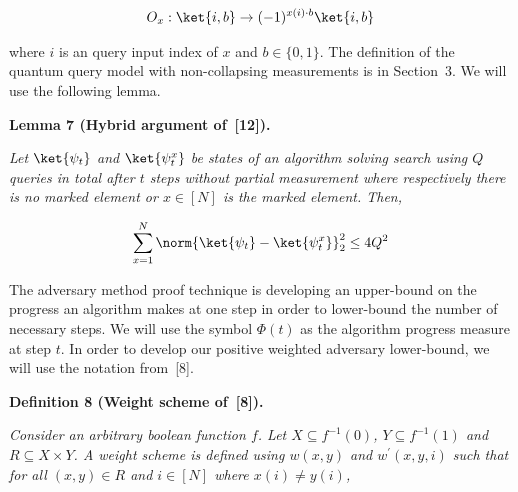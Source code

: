 \[\begin{gathered}
\displaystyle O_{x}:\ket{i,b}\rightarrow(-1)^{x(i)\cdot b}\ket{i,b}
\end{gathered}\]




where $i$ is an query input index of $x$ and $b\in\{0,1\}$. The definition of the quantum query model with non-collapsing measurements is in Section 3. We will use the following lemma.\par





\par\medskip\noindent\textbf{
\textbf{Lemma 7}\textbf{ }(Hybrid argument of [12])\textbf{.}
}\par



\emph{Let $\ket{\psi_{t}}$ and $\ket{\psi_{t}^{x}}$ be states of an algorithm solving search using $Q$ queries in total after $t$ steps without partial measurement where respectively there is no marked element or $x\in[N]$ is the marked element. Then,}\par


\[\begin{gathered}
\displaystyle\sum_{x=1}^{N}\norm{\ket{\psi_{t}}-\ket{\psi_{t}^{x}}}_{2}^{2}\leq 4Q^{2}
\end{gathered}\]






The adversary method proof technique is developing an upper-bound on the progress an algorithm makes at one step in order to lower-bound the number of necessary steps. We will use the symbol $\Phi(t)$ as the algorithm progress measure at step $t$. In order to develop our positive weighted adversary lower-bound, we will use the notation from [8].\par





\par\medskip\noindent\textbf{
\textbf{Definition 8}\textbf{ }(Weight scheme of [8])\textbf{.}
}\par



\emph{Consider an arbitrary boolean function $f$. Let $X\subseteq f^{-1}(0)$, $Y\subseteq f^{-1}(1)$ and $R\subseteq X\times Y$. A weight scheme is defined using $w(x,y)$ and $w^{\prime}(x,y,i)$ such that for all $(x,y)\in R$ and $i\in[N]$ where $x(i)\neq y(i)$,}\par


